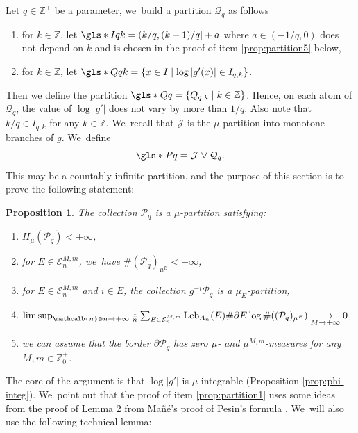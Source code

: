\documentclass[JEP,XML,SOM,Unicode,NoFloatCountersInSection,published]{cedram}
\DeclareMathOperator{\Leb}{Leb}
\newcommand{\mcbn}{{\mathcalb{n}}}
\newtheorem{prop}[thm]{Proposition}
\theoremstyle{definition}
\newcommand{\bbZ}{{\mathbb{Z}}}
\begin{document}
Let $q \in \bbZ^+$ be a parameter, we~build a partition $\mathcal{Q}_q$ as follows
\begin{enumerate}
\item
 for $k \in \bbZ$, let $\gls*{Iqk} = (k/q, (k+1)/q] + a$ where $a \in (-1/q, 0)$ does not depend on $k$ and is chosen in the proof of item \eqref{prop:partition5} below,
\item
 for $k \in \bbZ$, let
$\gls*{Qqk} = \{ x \in I \mid \log |g'(x)| \in I_{q,k} \}$.
\end{enumerate}
Then we define the partition
$\gls*{Qq} = \{ Q_{q,k} \mid k \in \bbZ \}$. Hence, on each atom of $\mathcal{Q}_q$, the value of $\log |g'|$ does not vary by more than $1/q$.
Also note that $k/q \in I_{q,k}$ for any $k \in \bbZ$. We~recall that $\mathcal{J}$ is the $\mu$-partition into monotone branches of $g$. We~define
\[
\gls*{Pq} = \mathcal{J} \vee \mathcal{Q}_q.
\]
This may be a countably infinite partition, and the purpose of this section is to prove the following statement:

\begin{prop}
\label{prop:partition}
The collection $\mathcal{P}_q$ is a $\mu$-partition satisfying:
\begin{enumerate}
\item\label{prop:partition1}
 $H_{\mu}(\mathcal{P}_q) < + \infty$,
\item\label{prop:partition2}
 for $E \in \mathcal{E}_n^{M,m}$, we~have $\# (\mathcal{P}_q)_{\mu^E} < + \infty$,
\item\label{prop:partition3}
 for $E \in \mathcal{E}_n^{M,m}$ and $i \in E$, the collection $g^{-i} \mathcal{P}_q$ is a $\mu_E$-partition,
\item\label{prop:partition4}
 $\limsup_{\mcbn \ni n \to +\infty} \frac{1}{n}\sum_{E \in \mathcal{E}_n^{M,m}} \Leb_{A_n}(E) \# \partial E \log \# ((\mathcal{P}_q)_{\mu^E}) \underset{M \to +\infty}{\longrightarrow} 0$,
\item\label{prop:partition5}
 we can assume that the border $\partial \mathcal{P}_q$ has zero $\mu$- and $\mu^{M,m}$-measures for any $M,m \in \bbZ_0^+$.
\end{enumerate}
\end{prop}

The core of the argument is that $\log |g'|$ is $\mu$-integrable (Proposition \ref{prop:phi-integ}). We~point out that the proof of item \eqref{prop:partition1} uses some ideas from the proof of Lemma 2 from Mañé's proof of Pesin's formula \cite{Mane_Pesin}. We~will also use the following technical lemma:
\end{document}
